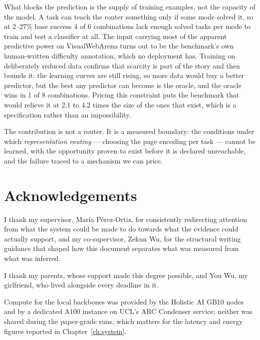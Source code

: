 What blocks the prediction is the supply of training examples, not the capacity
of the model. A task can teach the router something only if some mode solved it,
so at 2--27\% base success 4 of 6 combinations lack enough solved tasks per mode
to train and test a classifier at all. The input carrying most of the apparent
predictive power on VisualWebArena turns out to be the benchmark's own
human-written difficulty annotation, which no deployment has. Training on
deliberately reduced data confirms that scarcity is part of the story and then
bounds it: the learning curves are still rising, so more data would buy a better
predictor, but the best any predictor can become is the oracle, and the oracle
wins in 1 of 8 combinations. Pricing this constraint puts the benchmark that
would relieve it at 2.1 to 4.2 times the size of the ones that exist, which is a
specification rather than an impossibility.

The contribution is not a router. It is a measured boundary: the conditions
under which \emph{representation routing} --- choosing the page encoding per
task --- cannot be learned, with the
opportunity proven to exist before it is declared unreachable, and the failure
traced to a mechanism we can price.

\chapter*{Acknowledgements}

I thank my supervisor, Mar\'ia P\'erez-Ortiz, for consistently redirecting
attention from what the system could be made to do towards what the evidence
could actually support, and my co-supervisor, Zekun Wu, for the structural
writing guidance that shaped how this document separates what was measured from
what was inferred.

I thank my parents, whose support made this degree possible, and You Wu, my
girlfriend, who lived alongside every deadline in it.

Compute for the local backbones was provided by the Holistic AI GB10 nodes and
by a dedicated A100 instance on UCL's ARC Condenser service; neither was shared
during the paper-grade runs, which matters for the latency and energy figures
reported in Chapter~\ref{ch:system}.

